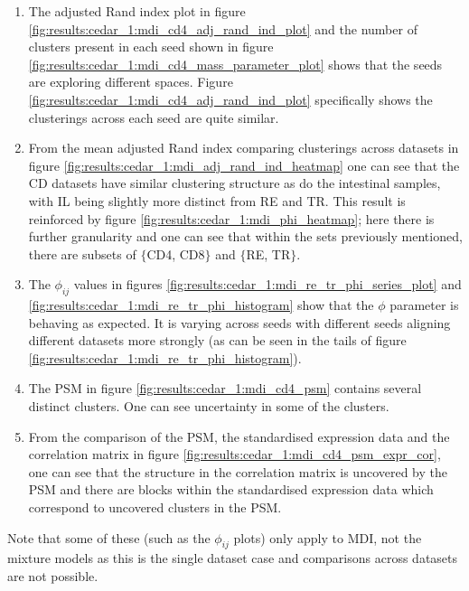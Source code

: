 \documentclass[14pt]{extarticle} %
\begin{document}
	\begin{enumerate}
		\item The adjusted Rand index plot in figure \ref{fig:results:cedar_1:mdi_cd4_adj_rand_ind_plot} and the number of clusters present in each seed shown in figure \ref{fig:results:cedar_1:mdi_cd4_mass_parameter_plot} shows that the seeds are exploring different spaces. Figure \ref{fig:results:cedar_1:mdi_cd4_adj_rand_ind_plot} specifically shows the clusterings across each seed are quite similar.
		\item From the mean adjusted Rand index comparing clusterings across datasets in figure \ref{fig:results:cedar_1:mdi_adj_rand_ind_heatmap} one can see that the CD datasets have similar clustering structure as do the intestinal samples, with IL being slightly more distinct from RE and TR. This result is reinforced by figure \ref{fig:results:cedar_1:mdi_phi_heatmap}; here there is further granularity and one can see that within the sets previously mentioned, there are subsets of $\{$CD4, CD8$\}$ and $\{$RE, TR$\}$.
		\item The $\phi_{ij}$ values in figures \ref{fig:results:cedar_1:mdi_re_tr_phi_series_plot} and \ref{fig:results:cedar_1:mdi_re_tr_phi_histogram} show that the $\phi$ parameter is behaving as expected. It is varying across seeds with different seeds aligning different datasets more strongly (as can be seen in the tails of figure \ref{fig:results:cedar_1:mdi_re_tr_phi_histogram}).
		\item The PSM in figure \ref{fig:results:cedar_1:mdi_cd4_psm} contains several distinct clusters. One can see uncertainty in some of the clusters.
		\item From the comparison of the PSM, the standardised expression data and the correlation matrix in figure \ref{fig:results:cedar_1:mdi_cd4_psm_expr_cor}, one can see that the structure in the correlation matrix is uncovered by the PSM and there are blocks within the standardised expression data which correspond to uncovered clusters in the PSM. %
	\end{enumerate}
	Note that some of these (such as the $\phi_{ij}$ plots) only apply to MDI, not the mixture models as this is the single dataset case and comparisons across datasets are not possible.
\end{document}
